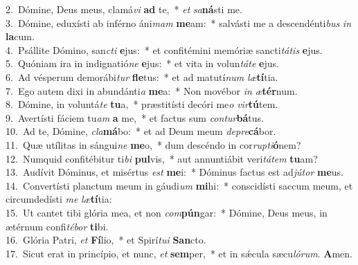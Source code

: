 {2.~}Dómine, Deus meus, clamá\textit{vi} \textbf{ad} te,~* \textit{et} \textit{sa}\textbf{ná}sti me.\\
{3.~}Dómine, eduxísti ab inférno áni\textit{mam} \textbf{me}am:~* salvásti me a descendénti\textit{bus} \textit{in} \textbf{la}cum.\\
{4.~}Psállite Dómino, san\textit{cti} \textbf{e}jus:~* et confitémini memóriæ sancti\textit{tá}\textit{tis} \textbf{e}jus.\\
{5.~}Quóniam ira in indignatió\textit{ne} \textbf{e}jus:~* et vita in volun\textit{tá}\textit{te} \textbf{e}jus.\\
{6.~}Ad vésperum demorábi\textit{tur} \textbf{fle}tus:~* et ad matutí\textit{num} \textit{læ}\textbf{tí}tia.\\
{7.~}Ego autem dixi in abundánti\textit{a} \textbf{me}a:~* Non movébor \textit{in} \textit{æ}\textbf{tér}num.\\
{8.~}Dómine, in voluntá\textit{te} \textbf{tu}a,~* præstitísti decóri me\textit{o} \textit{vir}\textbf{tú}tem.\\
{9.~}Avertísti fáciem tu\textit{am} \textbf{a} me,~* et factus sum \textit{con}\textit{tur}\textbf{bá}tus.\\
{10.~}Ad te, Dómine, \textit{cla}\textbf{má}bo:~* et ad Deum meum \textit{de}\textit{pre}\textbf{cá}bor.\\
{11.~}Quæ utílitas in sángui\textit{ne} \textbf{me}o,~* dum descéndo in cor\textit{rup}\textit{ti}\textbf{ó}nem?\\
{12.~}Numquid confitébitur ti\textit{bi} \textbf{pul}vis,~* aut annuntiábit veri\textit{tá}\textit{tem} \textbf{tu}am?\\
{13.~}Audívit Dóminus, et misértus \textit{est} \textbf{me}i:~* Dóminus factus est ad\textit{jú}\textit{tor} \textbf{me}us.\\
{14.~}Convertísti planctum meum in gáudi\textit{um} \textbf{mi}hi:~* conscidísti saccum meum, et circumdedísti \textit{me} \textit{læ}\textbf{tí}tia:\\
{15.~}Ut cantet tibi glória mea, et non \textit{com}\textbf{pún}gar:~* Dómine, Deus meus, in ætérnum confi\textit{té}\textit{bor} \textbf{ti}bi.\\
{16.~}Glória Patri, \textit{et} \textbf{Fí}lio,~* et Spirí\textit{tu}\textit{i} \textbf{San}cto.\\
{17.~}Sicut erat in princípio, et nunc, \textit{et} \textbf{sem}per,~* et in sǽcula sæcu\textit{ló}\textit{rum}. \textbf{A}men.\\
